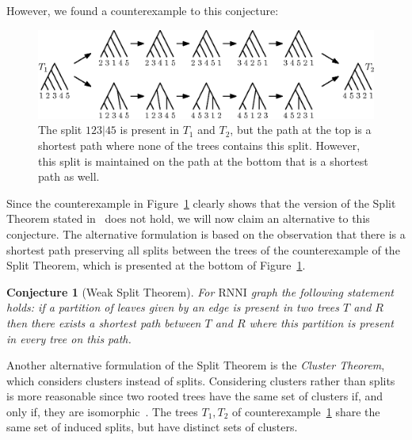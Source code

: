 \documentclass[11pt, a4paper]{article}
\newcommand{\rnni}{\mathrm{RNNI}}
\newtheorem{conjecture}[definition]{Conjecture}
\begin{document}
However, we found a counterexample to this conjecture:

\begin{figure}[H]
	\centering
	\includegraphics[width=\textwidth]{splitthm_counterexample}
	\caption{The split $123|45$ is present in $T_1$ and $T_2$, but the path at the top is a shortest path where none of the trees contains this split.
    However, this split is maintained on the path at the bottom that is a shortest path as well.}
	\label{splitthm_counterexample}
\end{figure}

Since the counterexample in Figure~\ref{splitthm_counterexample} clearly shows that the version of the Split Theorem stated in~\cite{Gavryushkin2017} does not hold, we will now claim an alternative to this conjecture.
The alternative formulation is based on the observation that there is a shortest path preserving all splits between the trees of the counterexample of the Split Theorem, which is presented at the bottom of Figure~\ref{splitthm_counterexample}.


\begin{conjecture}[Weak Split Theorem]
	For $\rnni$ graph the following statement holds:
	if a partition of leaves given by an edge is present in two trees $T$ and $R$ then there exists a shortest path between $T$ and $R$ where this partition is present in every tree on this path.
	\label{split_theorem_weak}
\end{conjecture}



Another alternative formulation of the Split Theorem is the \emph{Cluster Theorem}, which considers clusters instead of splits.
Considering clusters rather than splits is more reasonable since two rooted trees have the same set of clusters if, and only if, they are isomorphic~\cite{steel2016}.
The trees $T_1, T_2$ of counterexample~\ref{splitthm_counterexample} share the same set of induced splits, but have distinct sets of clusters.
\end{document}
